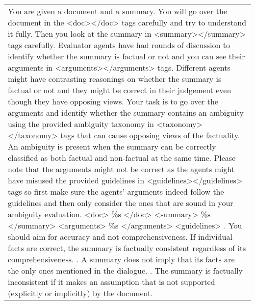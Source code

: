 \begin{table*}
\centering
\scriptsize
\begin{tabular}{@{}p{14cm}@{}}
\toprule
You are given a document and a summary. You will go over the document in the <doc></doc> tags carefully and try to understand it fully. Then you look at the summary in <summary></summary> tags carefully. Evaluator agents have had rounds of discussion to identify whether the summary is factual or not and you can see their arguments in <arguments></arguments> tags. Different agents might have contrasting reasonings on whether the summary is factual or not and they might be correct in their judgement even though they have opposing views. Your task is to go over the arguments and identify whether the summary contains an ambiguity using the provided ambiguity taxonomy in <taxonomy></taxonomy> tags that can cause opposing views of the factuality. An ambiguity is present when the summary can be correctly classified as both factual and non-factual at the same time. Please note that the arguments might not be correct as the agents might have misused the provided guidelines in <guidelines></guidelines> tags so first make sure the agents’ arguments indeed follow the guidelines and then only consider the ones that are sound in your ambiguity evaluation.
\newline
\newline
 <doc>
    \newline
    \%s
    \newline
    </doc>
    \newline
    \newline
    <summary>
    \newline
    \%s
    \newline
    </summary>
    \newline
    \newline
    <arguments>
    \newline
    \%s
    \newline
    </arguments>
    \newline
    \newline
<guidelines>
\newline
    1. You should aim for accuracy and not comprehensiveness. If individual facts are correct, the summary is factually consistent regardless of its comprehensiveness.
    \newline
    2. A summary does not imply that its facts are the only ones mentioned in the dialogue.
    \newline
    3. The summary is factually inconsistent if it makes an assumption that is not supported (explicitly or implicitly) by the document.

\end{tabular}
\end{table*}

